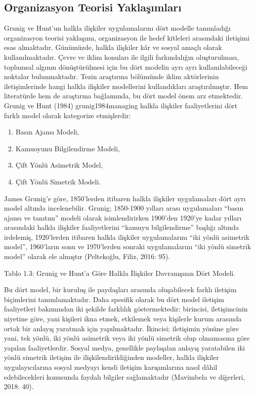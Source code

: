 \documentclass[
]{book}
\providecommand{\tightlist}{%
  \setlength{\itemsep}{0pt}\setlength{\parskip}{0pt}}
\begin{document}
\hypertarget{organizasyon-teorisi-yaklaux15fux131mlarux131}{%
\subsection{Organizasyon Teorisi Yaklaşımları}\label{organizasyon-teorisi-yaklaux15fux131mlarux131}}

Grunig ve Hunt'un halkla ilişkiler uygulamalarını dört modelle tanımladığı organizasyon teorisi yaklaşımı, organizasyon ile hedef kitleleri arasındaki iletişimi esas almaktadır. Günümüzde, halkla ilişkiler kâr ve sosyal amaçlı olarak kullanılmaktadır. Çevre ve iklim konuları ile ilgili farkındalığın oluşturulması, toplumsal algının dönüştürülmesi için bu dört modelin ayrı ayrı kullanılabileceği noktalar bulunmaktadır. Tezin araştırma bölümünde iklim aktörlerinin iletişimlerinde hangi halkla ilişkiler modellerini kullandıkları araştırılmıştır. Hem literatürde hem de araştırma bağlamında, bu dört model önem arz etmektedir.
Grunig ve Hunt (1984) grunig1984managing halkla ilişkiler faaliyetlerini dört farklı model olarak kategorize etmişlerdir:

\begin{enumerate}
\def\labelenumi{\arabic{enumi}.}
\tightlist
\item
  Basın Ajansı Modeli,
\item
  Kamuoyunu Bilgilendirme Modeli,
\item
  Çift Yönlü Asimetrik Model,
\item
  Çift Yönlü Simetrik Modeli.
\end{enumerate}

James Grunig'e göre, 1850'lerden itibaren halkla ilişkiler uygulamaları dört ayrı model altında incelenebilir. Grunig; 1850-1900 yılları arası uygulamaları ``basın ajansı ve tanıtım'' modeli olarak isimlendirirken 1900'den 1920'ye kadar yılları arasındaki halkla ilişkiler faaliyetlerini ``kamuyu bilgilendirme'' başlığı altında irdelemiş, 1920'lerden itibaren halkla ilişkiler uygulamalarını ``iki yönlü asimetrik model'', 1960'ların sonu ve 1970'lerden sonraki uygulamalarını ``iki yönlü simetrik model'' olarak ele almıştır (Peltekoğlu, Filiz, 2016: 95). \citep{peltekoglu2016halkla}

Tablo 1.3: Grunig ve Hunt'a Göre Halkla İlişkiler Davranışının Dört Modeli.

Bu dört model, bir kuruluş ile paydaşları arasında oluşabilecek farklı iletişim biçimlerini tanımlamaktadır. Daha spesifik olarak bu dört model iletişim faaliyetleri bakımından iki şekilde farklılık göstermektedir: birincisi, iletişimcinin niyetine göre, yani kişileri ikna etmek, etkilemek veya kişilerle kurum arasında ortak bir anlayış yaratmak için yapılmaktadır. İkincisi; iletişimin yönüne göre yani, tek yönlü, iki yönlü asimetrik veya iki yönlü simetrik olup olmamasına göre yapılan faaliyetlerdir. Sosyal medya, genellikle paylaşılan anlayış yaratabilen iki yönlü simetrik iletişim ile ilişkilendirildiğinden modeller, halkla ilişkiler uygulayıcılarına sosyal medyayı kendi iletişim karışımlarına nasıl dâhil edebilecekleri konusunda faydalı bilgiler sağlamaktadır (Mavimbela ve diğerleri, 2018: 40). \citep{mavimbela2018perceived}
\end{document}
